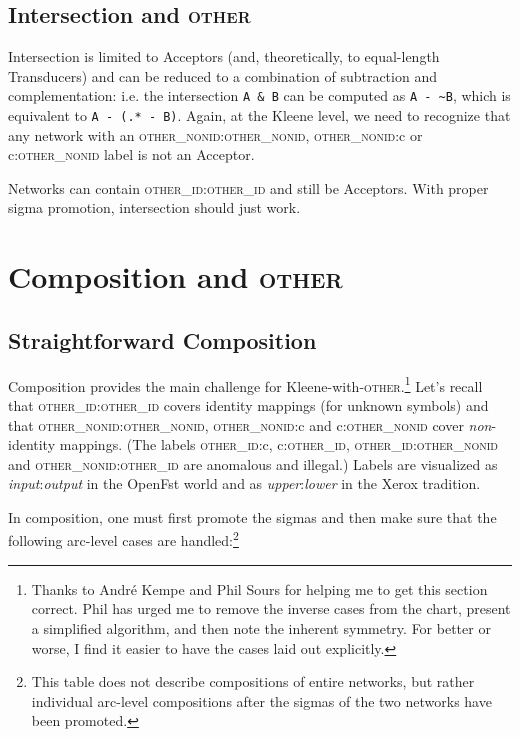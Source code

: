 \documentclass[letterpaper,11pt]{article}
\providecommand{\acro}{}\renewcommand{\acro}{\textsc}
\begin{document}
\subsection{Intersection and \acro{other}}

Intersection is limited to Acceptors (and, theoretically, to equal-length Transducers) and can
be reduced to a combination of subtraction and complementation: i.e.\@ 
the intersection \texttt{A~\&~B}
can be computed as \texttt{A~-~\~{}B}, which is equivalent to \texttt{A~-~(.* - B)}.
Again, at the
Kleene level, we need to recognize that any network with an
\acro{other\_nonid}:\acro{other\_nonid}, \acro{other\_nonid}:c or c:\acro{other\_nonid} label is not an Acceptor.

Networks can contain \acro{other\_id}:\acro{other\_id} and still be Acceptors.  With proper sigma promotion,
intersection should just work.


\section{Composition and \acro{other}}

\subsection{Straightforward Composition}

Composition provides the main challenge for Kleene-with-\acro{other}.\footnote{Thanks to Andr\'e
Kempe and Phil Sours for helping me to get this section correct.  Phil has urged me to remove
the inverse cases from the chart, present a simplified algorithm, and then note the
inherent symmetry.  For better or worse, I find it easier to have the cases laid out
explicitly.}
Let's recall that \acro{other\_id}:\acro{other\_id} covers
identity mappings (for unknown symbols) and that
\acro{other\_nonid}:\acro{other\_nonid}, \acro{other\_nonid}:c and c:\acro{other\_nonid} cover \emph{non}-identity mappings.
(The labels \acro{other\_id}:c, c:\acro{other\_id}, \acro{other\_id}:\acro{other\_nonid} and \acro{other\_nonid}:\acro{other\_id} are
anomalous and illegal.)
Labels are visualized as
\emph{input}:\emph{output} in the OpenFst world and as
\emph{upper}:\emph{lower} in the Xerox tradition.

In composition, one must first promote the sigmas and then make
sure that the following arc-level cases are
handled:\footnote{This table does not describe compositions of
entire networks, but rather individual arc-level compositions after the sigmas
of the two networks have been promoted.}
\end{document}
